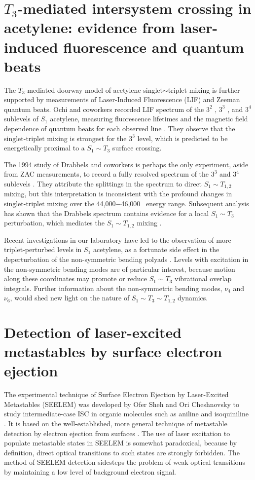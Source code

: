 \documentclass[12pt]{mitthesis}
\begin{document}
\section{$T_3$-mediated intersystem crossing in acetylene: evidence
  from laser-induced fluorescence and quantum beats}

The $T_3$-mediated doorway model of acetylene singlet$\sim$triplet
mixing is further supported by measurements of Laser-Induced
Fluorescence (LIF) and Zeeman quantum beats.  Ochi and coworkers
recorded LIF spectrum of the $3^2$ , $3^3$ , and $3^4$
 sublevels of $S_1$ acetylene, measuring fluorescence lifetimes
and the magnetic field dependence of quantum beats for each observed
line \cite{ochi91}.  They observe that the singlet-triplet mixing is
strongest for the $3^3$  level, which is predicted to be
energetically proximal to a $S_1 \sim T_3$ surface crossing.

The 1994 study of Drabbels and coworkers is perhaps the only
experiment, aside from ZAC measurements, to record a fully resolved
spectrum of the $3^3$  and $3^4$  sublevels
\cite{drabbels94}.  They attribute the splittings in the spectrum to
direct $S_1 \sim T_{1,2}$ mixing, but this interpretation is
inconsistent with the profound changes in singlet-triplet mixing over
the 44,000$-$46,000 \rcm\ energy range.  Subsequent analysis has shown
that the Drabbels spectrum contains evidence for a local $S_1 \sim
T_3$ perturbation, which mediates the $S_1 \sim T_{1,2}$ mixing
\cite{altunata01}.

Recent investigations in our laboratory have led to the observation of
more triplet-perturbed levels in $S_1$ acetylene, as a fortunate side
effect in the deperturbation of the non-symmetric bending polyads
\cite{merer08, steeves08}.  Levels with excitation in the
non-symmetric bending modes are of particular interest, because motion
along these coordinates may promote or reduce $S_1 \sim T_3$
vibrational overlap integrals.  Further information about the
non-symmetric bending modes, $\nu_4$ and $\nu_6$, would shed new light
on the nature of $S_1 \sim T_3 \sim T_{1,2}$ dynamics.

\section{Detection of laser-excited metastables by surface electron
  ejection}

The experimental technique of Surface Electron Ejection by
Laser-Excited Metastables (SEELEM) was developed by Ofer Sheh and Ori
Cheshnovsky to study intermediate-case ISC in organic molecules such
as aniline and isoquiniline \cite{sneh86, sneh88, sneh89a, sneh89b,
  sneh91}.  It is based on the well-established, more general
technique of metastable detection by electron ejection from surfaces
\cite{hotop96}.  The use of laser excitation to populate metastable
states in SEELEM is somewhat paradoxical, because by definition,
direct optical transitions to such states are strongly forbidden.  The
method of SEELEM detection sidesteps the problem of weak optical
transitions by maintaining a low level of background electron signal.
\end{document}
